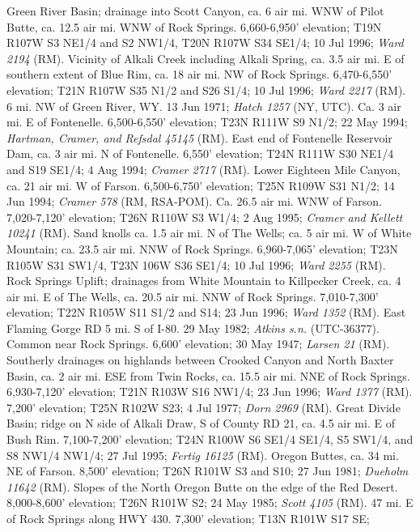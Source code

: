 Green River Basin; drainage into Scott Canyon, ca. 6 air mi. WNW of Pilot Butte,
ca. 12.5 air mi. WNW of Rock Springs. 6,660-6,950' elevation;
T19N R107W S3 NE1/4 and S2 NW1/4, T20N R107W S34 SE1/4; 10 Jul 1996;
\textit{Ward 2194} (RM).
Vicinity of Alkali Creek including Alkali Spring, ca. 3.5 air mi. E of southern
extent of Blue Rim, ca. 18 air mi. NW of Rock Springs. 6,470-6,550' elevation;
T21N R107W S35 N1/2 and S26 S1/4; 10 Jul 1996; \textit{Ward 2217} (RM).
6 mi. NW of Green River, WY. 13 Jun 1971; \textit{Hatch 1257} (NY, UTC).
Ca. 3 air mi. E of Fontenelle.  6,500-6,550' elevation;
T23N R111W S9 N1/2; 22 May 1994; \textit{Hartman, Cramer, and Refsdal 45145} (RM).
East end of Fontenelle Reservoir Dam, ca. 3 air mi. N of Fontenelle. 6,550'
elevation; T24N R111W S30 NE1/4 and S19 SE1/4; 4 Aug 1994; \textit{Cramer 2717} (RM).
Lower Eighteen Mile Canyon, ca. 21 air mi. W of Farson. 6,500-6,750' elevation;
T25N R109W S31 N1/2; 14 Jun 1994; \textit{Cramer 578} (RM, RSA-POM).
Ca. 26.5 air mi. WNW of Farson. 7,020-7,120' elevation; T26N R110W S3 W1/4;
2 Aug 1995; \textit{Cramer and Kellett 10241} (RM).
Sand knolls ca. 1.5 air mi. N of The Wells; ca. 5 air mi. W of White Mountain;
ca. 23.5 air mi. NNW of Rock Springs. 6,960-7,065' elevation; T23N R105W S31
SW1/4, T23N 106W S36 SE1/4; 10 Jul 1996; \textit{Ward 2255} (RM).
Rock Springs Uplift; drainages from White Mountain to Killpecker Creek, ca. 4
air mi. E of The Wells, ca. 20.5 air mi. NNW of Rock Springs. 7,010-7,300'
elevation; T22N R105W S11 S1/2 and S14; 23 Jun 1996; \textit{Ward 1352} (RM).
East Flaming Gorge RD 5 mi. S of I-80. 29 May 1982;
\textit{Atkins s.n.} (UTC-36377).
Common near Rock Springs. 6,600' elevation; 30 May 1947; \textit{Larsen 21} (RM).
Southerly drainages on highlands between Crooked Canyon and North Baxter Basin,
ca. 2 air mi. ESE from Twin Rocks, ca. 15.5 air mi. NNE of Rock Springs.
6,930-7,120' elevation; T21N R103W S16 NW1/4; 23 Jun 1996; \textit{Ward 1377} (RM).
7,200' elevation; T25N R102W S23; 4 Jul 1977; \textit{Dorn 2969} (RM).
Great Divide Basin; ridge on N side of Alkali Draw, S of County RD 21, ca. 4.5
air mi. E of Bush Rim. 7,100-7,200' elevation; T24N R100W S6 SE1/4 SE1/4,
S5 SW1/4, and S8 NW1/4 NW1/4; 27 Jul 1995; \textit{Fertig 16125} (RM).
Oregon Buttes, ca. 34 mi. NE of Farson. 8,500' elevation; T26N R101W S3 and S10;
27 Jun 1981; \textit{Dueholm 11642} (RM).
Slopes of the North Oregon Butte on the edge of the Red Desert. 8,000-8,600'
elevation; T26N R101W S2; 24 May 1985; \textit{Scott 4105} (RM).
47 mi. E of Rock Springs along HWY 430. 7,300' elevation; T13N R101W S17 SE;
